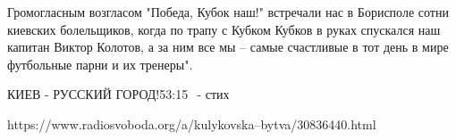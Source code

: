 Громогласным возгласом "Победа, Кубок наш!" встречали нас в Борисполе сотни
киевских болельщиков, когда по трапу с Кубком Кубков в руках спускался наш
капитан Виктор Колотов, а за ним все мы – самые счастливые в тот день в мире
футбольные парни и их тренеры".



КИЕВ - РУССКИЙ ГОРОД!⁣⁣53:15⠀- стих





https://www.radiosvoboda.org/a/kulykovska--bytva/30836440.html
